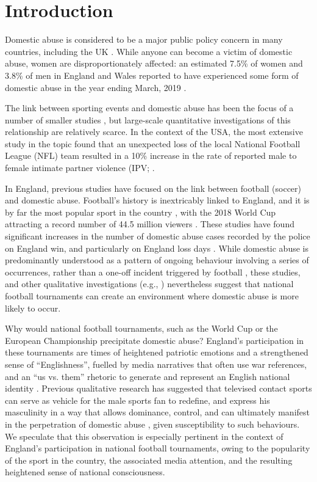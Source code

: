 \documentclass[12pt, a4paper]{article}
\begin{document}
\newpage
\RaggedRight
\section{Introduction}


Domestic abuse is considered to be a major public policy concern in many countries, including the UK \cite{ep}. While anyone can become a victim of domestic abuse, women are disproportionately affected: an estimated 7.5\% of women and 3.8\% of men in England and Wales reported to have experienced some form of domestic abuse in the year ending March, 2019 \cite{ONS2019}.


The link between sporting events and domestic abuse has been the focus of a number of smaller studies \cite{Williams2014}, but large-scale quantitative investigations of this relationship are relatively scarce. In the context of the USA, the most extensive study in the topic found that an unexpected loss of the local National Football League (NFL) team resulted in a 10\% increase in the rate of reported male to female intimate partner violence (IPV; .

In England, previous studies have focused on the link between football (soccer) and domestic abuse. Football's history is inextricably linked to England, and it is by far the most popular sport in the country \cite{Parry2014}, with the 2018 World Cup attracting a record number of 44.5 million viewers \cite{BBC}. These studies have found significant increases in the number of domestic abuse cases recorded by the police on England win, and particularly on England loss days \cite{Brimicombe2012, Kirby2014}. While domestic abuse is predominantly understood as a pattern of ongoing behaviour involving a series of occurrences, rather than a one-off incident triggered by football \cite{Brooks-Hay2018}, these studies, and other qualitative investigations (e.g., ) nevertheless suggest that national football tournaments can create an environment where domestic abuse is more likely to occur.




Why would national football tournaments, such as the World Cup or the European Championship precipitate domestic abuse? England's participation in these tournaments are times of heightened patriotic emotions and a strengthened sense of ``Englishness'', fuelled by media narratives that often use war references, and an ``us vs. them'' rhetoric to generate and represent an English national identity \cite{Vincent2014}. Previous qualitative research has suggested that televised contact sports can serve as vehicle for the male sports fan to redefine, and express his masculinity in a way that allows dominance, control, and can ultimately manifest in the perpetration of domestic abuse \cite{Sabo,Swallow}, given susceptibility to such behaviours. We speculate that this observation is especially pertinent in the context of England's participation in national football tournaments, owing to the popularity of the sport in the country, the associated media attention, and the resulting heightened sense of national consciousness. 
\end{document}
